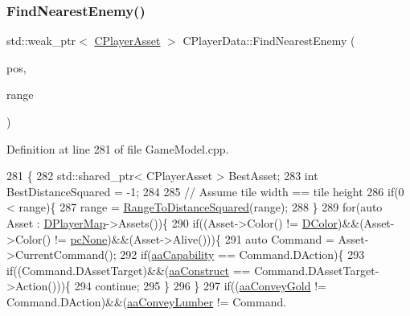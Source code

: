 \subsubsection{\texorpdfstring{Find\+Nearest\+Enemy()}{FindNearestEnemy()}}
{\footnotesize\ttfamily std\+::weak\+\_\+ptr$<$ \hyperlink{classCPlayerAsset}{C\+Player\+Asset} $>$ C\+Player\+Data\+::\+Find\+Nearest\+Enemy (\begin{DoxyParamCaption}\item[{const \hyperlink{classCPosition}{C\+Position} \&}]{pos,  }\item[{int}]{range }\end{DoxyParamCaption})}



Definition at line 281 of file Game\+Model.\+cpp.


\begin{DoxyCode}
281                                                                                         \{
282     std::shared\_ptr< CPlayerAsset > BestAsset;
283     \textcolor{keywordtype}{int} BestDistanceSquared = -1;
284     
285     \textcolor{comment}{// Assume tile width == tile height}
286     \textcolor{keywordflow}{if}(0 < range)\{
287         range = \hyperlink{GameModel_8cpp_afd5c111a1369dc53d1b1230506e99f7c}{RangeToDistanceSquared}(range);
288     \}
289     \textcolor{keywordflow}{for}(\textcolor{keyword}{auto} Asset : \hyperlink{classCPlayerData_a452163191cd4603e1e38dd8d4bb9691c}{DPlayerMap}->Assets())\{
290         \textcolor{keywordflow}{if}((Asset->Color() != \hyperlink{classCPlayerData_a65d69aaa09c8fc0f7ddfa5e858313085}{DColor})&&(Asset->Color() != \hyperlink{GameDataTypes_8h_aafb0ca75933357ff28a6d7efbdd7602fa88767aa8e02c7b3192bbab4127b3d729}{pcNone})&&(Asset->Alive()))\{
291             \textcolor{keyword}{auto} Command = Asset->CurrentCommand();
292             \textcolor{keywordflow}{if}(\hyperlink{GameDataTypes_8h_ab47668e651a3032cfb9c40ea2d60d670acf9fb164e8abd71c71f4a8c7fda360d4}{aaCapability} == Command.DAction)\{
293                 \textcolor{keywordflow}{if}((Command.DAssetTarget)&&(\hyperlink{GameDataTypes_8h_ab47668e651a3032cfb9c40ea2d60d670a7ef6b863f66dd7dcc95a199cd758ae1d}{aaConstruct} == Command.DAssetTarget->Action()))\{
294                     \textcolor{keywordflow}{continue};   
295                 \}
296             \}
297             \textcolor{keywordflow}{if}((\hyperlink{GameDataTypes_8h_ab47668e651a3032cfb9c40ea2d60d670ae80ac4dde60023e0a1794e994db7000a}{aaConveyGold} != Command.DAction)&&(\hyperlink{GameDataTypes_8h_ab47668e651a3032cfb9c40ea2d60d670a7b0954302f27f46b3fdf6fddd530d154}{aaConveyLumber} != Command.

\end{DoxyCode}

